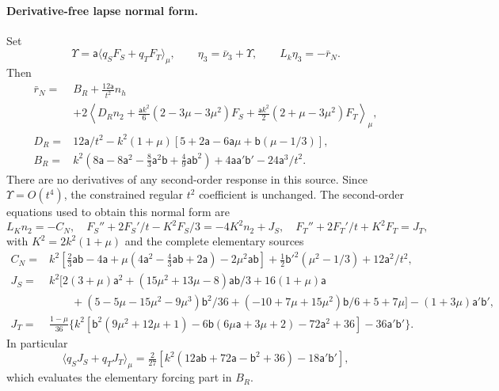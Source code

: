 \paragraph{Derivative-free lapse normal form.}
Set
\begin{equation}\label{eq:cubic-normal-form}
 \Upsilon=\mathsf a\langle q_SF_S+q_TF_T\rangle_\mu,\qquad
 \eta_3=\bar\nu_3+\Upsilon,\qquad L_k\eta_3=-\bar r_N.
\end{equation}
Then
\begin{equation}\label{eq:cubic-reduced-source}
\begin{split}
 \bar r_N={}&B_R+\frac{12\mathsf a}{t^2}n_h\\
 &+2\left\langle D_R n_2+\frac{\mathsf a k^2}{6}(2-3\mu-3\mu^2)F_S
 +\frac{\mathsf a k^2}{2}(2+\mu-3\mu^2)F_T\right\rangle_\mu,\\
 D_R={}&12\mathsf a/t^2-k^2(1+\mu)[5+2\mathsf a-6\mathsf a\mu+\mathsf b(\mu-1/3)],\\
 B_R={}&k^2(8\mathsf a-8\mathsf a^2-\tfrac83\mathsf a^2\mathsf b+\tfrac49\mathsf a\mathsf b^2)
 +4\mathsf a\mathsf a'\mathsf b'-24\mathsf a^3/t^2.
\end{split}
\end{equation}
There are no derivatives of any second-order response in this source.
Since $\Upsilon=O(t^4)$, the constrained regular $t^2$ coefficient is unchanged.
The second-order equations used to obtain this normal form are
\begin{equation}\label{eq:moment-pair-equations}
 L_Kn_2=-C_N,\quad
 F_S''+2F_S'/t-K^2F_S/3=-4K^2n_2+J_S,\quad
 F_T''+2F_T'/t+K^2F_T=J_T,
\end{equation}
with $K^2=2k^2(1+\mu)$ and the complete elementary sources
\begin{align}
 C_N={}&k^2[\tfrac23\mathsf a\mathsf b-4\mathsf a
 +\mu(4\mathsf a^2-\tfrac43\mathsf a\mathsf b+2\mathsf a)-2\mu^2\mathsf a\mathsf b]
 +\tfrac12\mathsf b'^2(\mu^2-1/3)+12\mathsf a^2/t^2,\label{eq:moment-CN}\\
 J_S={}&k^2\big[2(3+\mu)\mathsf a^2+(15\mu^2+13\mu-8)\mathsf a\mathsf b/3
 +16(1+\mu)\mathsf a\nonumber\\
 &\qquad+(5-5\mu-15\mu^2-9\mu^3)\mathsf b^2/36
 +(-10+7\mu+15\mu^2)\mathsf b/6+5+7\mu\big]
 -(1+3\mu)\mathsf a'\mathsf b',\label{eq:moment-JS}\\
 J_T={}&\frac{1-\mu}{36}\big\{k^2[\mathsf b^2(9\mu^2+12\mu+1)
 -6\mathsf b(6\mu\mathsf a+3\mu+2)-72\mathsf a^2+36]-36\mathsf a'\mathsf b'\big\}.
 \label{eq:moment-JT}
\end{align}
In particular
\[
 \langle q_SJ_S+q_TJ_T\rangle_\mu
 =\tfrac2{27}[k^2(12\mathsf a\mathsf b+72\mathsf a-\mathsf b^2+36)-18\mathsf a'\mathsf b'],
\]
which evaluates the elementary forcing part in $B_R$.

